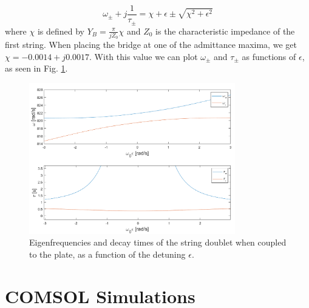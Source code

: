 \documentclass[a4paper]{article}
\begin{document}
$$ \omega_{\pm} + j \frac{1}{\tau_{\pm}} = \chi + \epsilon \pm \sqrt{\chi^2 + \epsilon^2}  $$
where $\chi$ is defined by $Y_B = \frac{\pi }{j Z_0}\chi$ and $Z_0$ is the characteristic impedance of the first string. When placing the bridge at one of the admittance maxima, we get $\chi = -0.0014 + j 0.0017$. With this value we can plot $\omega_{\pm}$ and $\tau_{\pm}$ as functions of $\epsilon$, as seen in Fig. \ref{fig:doub}.

\begin{figure}[h]
	\centering
	\includegraphics[width=0.8\textwidth]{doublet.png}
	\caption{Eigenfrequencies and decay times of the string doublet when coupled to the plate, as a function of the detuning $\epsilon$.}
	\label{fig:doub}
\end{figure}

\printbibliography

\appendix
\newpage
\section{COMSOL Simulations}
\end{document}
